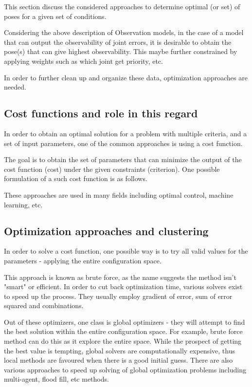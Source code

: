 \documentclass[english, printversion, nomenclature, notitle]{tuvisionthesis} %
\begin{document}
This section discuss the considered approaches to determine optimal (or set) of poses for a given set of conditions.

Considering the above description of Observation models, in the case of a model that can output the observability of joint errors, it is desirable to obtain the pose(s) that can give highest observability. This maybe further constrained by applying weights such as which joint get priority, etc.

In order to further clean up and organize these data, optimization approaches are needed.

\subsection{Cost functions and role in this regard}

In order to obtain an optimal solution for a problem with multiple criteria, and a set of input parameters, one of the common approaches is using a cost function.

The goal is to obtain the set of parameters that can minimize the output of the cost function (cost) under the given constraints (criterion). One possible formulation of a such cost function is as follows.


These approaches are used in many fields including optimal control, machine learning, etc.

\subsection{Optimization approaches and clustering}

In order to solve a cost function, one possible way is to try all valid values for the parameters - applying the entire configuration space.

This approach is known as brute force, as the name suggests the method isn't "smart" or efficient. In order to cut back optimization time, various solvers exist to speed up the process. They usually employ gradient of error, sum of error squared and combinations.

Out of these optimizers, one class is global optimizers - they will attempt to find the best solution within the entire configuration space. For example, brute force method can do this as it explore the entire space. While the prospect of getting the best value is tempting, global solvers are computationally expensive, thus local methods are favoured when there is a good initial guess. There are also various approaches to speed up solving of global optimization problems including multi-agent, flood fill, etc methods. 
\end{document}
